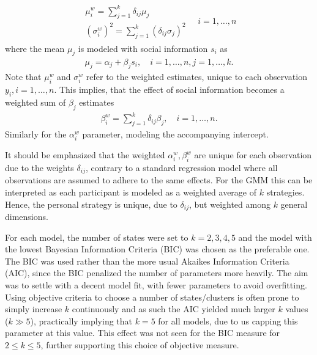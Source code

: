 \documentclass[9pt,a4paper,twocolumn,lineno]{article}
\begin{document}
\begin{align}
\begin{array}{l}
	\mu^w_i = \sum_{j=1}^k \delta_{ij} \mu_j \\
	(\sigma^w_i)^2 = \sum_{j=1}^k \left(\delta_{ij} \sigma_j\right)^2
\end{array}
\quad i=1,\dots,n \label{eq: weighted Gaussian parameters}
\end{align}
where the mean $\mu_j$ is modeled with social information $s_i$ as
\begin{align}
	\mu_j = \alpha_j+\beta_j s_i, \quad i=1,\dots,n, j=1,\dots,k.
\end{align}
Note that $\mu^w_i$ and $\sigma^w_i$ refer to the weighted estimates, unique to each observation $y_i, i=1, \dots, n$. This implies, that the effect of social information becomes a weighted sum of $\beta_j$ estimates
\begin{align}
	\beta^w_i = \sum_{j=1}^k \delta_{ij} \beta_{j}, \quad i=1,\dots, n. \label{eq: weighted beta}
\end{align}
Similarly for the $\alpha_i^w$ parameter, modeling the accompanying intercept.

It should be emphasized that the weighted $\alpha_i^w,\beta_i^w$ are unique for each observation due to the weights $\delta_{ij}$, contrary to a standard regression model where all observations are assumed to adhere to the same effects. For the GMM this can be interpreted as each participant is modeled as a weighted average of $k$ strategies. Hence, the personal strategy is unique, due to $\delta_{ij}$, but weighted among $k$ general dimensions. 

For each model, the number of states were set to $k=2,3,4,5$ and the model with the lowest Bayesian Information Criteria (BIC) was chosen as the preferable one. The BIC was used rather than the more usual Akaikes Information Criteria (AIC), since the BIC penalized the number of parameters more heavily. The aim was to settle with a decent model fit, with fewer parameters to avoid overfitting. Using objective criteria to choose a number of states/clusters is often prone to simply increase $k$ continuously \cite{hastie2009} and as such the AIC yielded much larger $k$ values ($k \gg 5$), practically implying that $k=5$ for all models, due to us capping this parameter at this value. This effect was not seen for the BIC measure for $2\leq k \leq 5$, further supporting this choice of objective measure.
\end{document}
